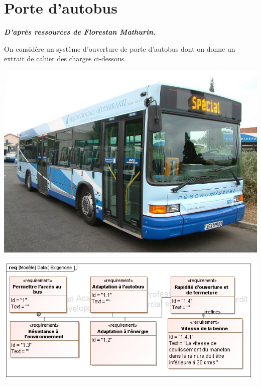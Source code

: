 \documentclass[10pt,fleqn]{article} %
\begin{document}
\newpage

\section{Porte d'autobus}
\begin{flushright}
\textbf{\textit{D'après ressources de Florestan Mathurin.}}
\end{flushright}

\setcounter{exo}{0}
On considère un système d'ouverture de porte d'autobus dont on donne un extrait de cahier des charges ci-dessous.

\begin{minipage}[c]{.3\linewidth}
\begin{center}
\includegraphics[width=.95\textwidth]{images/fig6_1}\hfill
\end{center}
\end{minipage} \hfill
\begin{minipage}[c]{.65\linewidth}
\begin{center}
\includegraphics[width=.95\textwidth]{images/SysML/Exigences_Bus}
\end{center}
\end{minipage}
 
\end{document}
